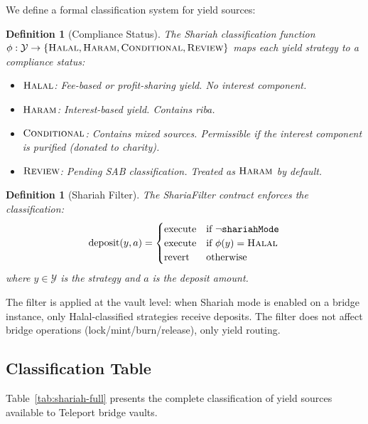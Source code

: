\documentclass[11pt,twocolumn]{article}
\newtheorem{definition}[theorem]{Definition}
\theoremstyle{definition}
\newcommand{\Strategy}{\mathcal{Y}}
\newcommand{\halal}{\textsc{Halal}}
\newcommand{\haram}{\textsc{Haram}}
\newcommand{\cond}{\textsc{Conditional}}
\begin{document}
We define a formal classification system for yield sources:

\begin{definition}[Compliance Status]
\label{def:compliance}
The Shariah classification function $\phi: \Strategy \to \{\halal, \haram, \cond, \textsc{Review}\}$ maps each yield strategy to a compliance status:
\begin{itemize}[nosep]
  \item $\halal$: Fee-based or profit-sharing yield. No interest component.
  \item $\haram$: Interest-based yield. Contains riba.
  \item $\cond$: Contains mixed sources. Permissible if the interest component is purified (donated to charity).
  \item $\textsc{Review}$: Pending SAB classification. Treated as $\haram$ by default.
\end{itemize}
\end{definition}

\begin{definition}[Shariah Filter]
\label{def:filter}
The ShariaFilter contract enforces the classification:
\begin{equation}
  \text{deposit}(y, a) =
  \begin{cases}
    \text{execute} & \text{if } \neg\texttt{shariahMode} \\
    \text{execute} & \text{if } \phi(y) = \halal \\
    \text{revert} & \text{otherwise}
  \end{cases}
\end{equation}
where $y \in \Strategy$ is the strategy and $a$ is the deposit amount.
\end{definition}

The filter is applied at the vault level: when Shariah mode is enabled on a bridge instance, only Halal-classified strategies receive deposits. The filter does not affect bridge operations (lock/mint/burn/release), only yield routing.

\subsection{Classification Table}

Table~\ref{tab:shariah-full} presents the complete classification of yield sources available to Teleport bridge vaults.
\end{document}
